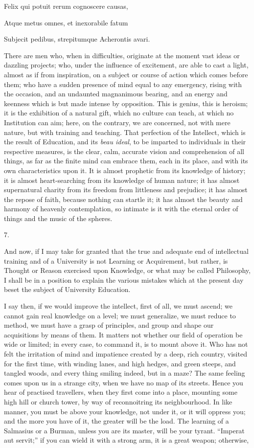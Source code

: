 Felix qui potuit rerum cognoscere causas,

Atque metus omnes, et inexorabile fatum

Subjecit pedibus, strepitumque Acherontis avari.

There are men who, when in difficulties, originate at the moment
vast ideas or dazzling projects; who, under the influence of
excitement, are able to cast a light, almost as if from inspiration,
on a subject or course of action which comes before them; who have a
sudden presence of mind equal to any emergency, rising with the
occasion, and an undaunted magnanimous bearing, and an energy and
keenness which is but made intense by opposition. This is genius, this
is heroism; it is the exhibition of a natural gift, which no culture
can teach, at which no Institution can aim; here, on the
contrary, we are concerned, not with mere nature, but with training
and teaching. That perfection of the Intellect, which is the result of
Education, and its \emph{beau ideal}, to be imparted to individuals in
their respective measures, is the clear, calm, accurate vision and
comprehension of all things, as far as the finite mind can embrace
them, each in its place, and with its own characteristics upon it. It
is almost prophetic from its knowledge of history; it is almost
heart-searching from its knowledge of human nature; it has almost
supernatural charity from its freedom from littleness and prejudice;
it has almost the repose of faith, because nothing can startle it; it
has almost the beauty and harmony of heavenly contemplation, so
intimate is it with the eternal order of things and the music of the
spheres.

7.

And now, if I may take for granted that the true and adequate end
of intellectual training and of a University is not Learning or
Acquirement, but rather, is Thought or Reason exercised upon
Knowledge, or what may be called Philosophy, I shall be in a position
to explain the various mistakes which at the present day beset the
subject of University Education.

I say then, if we would improve the intellect, first of all, we
must ascend; we cannot gain real knowledge on a level; we must
generalize, we must reduce to method, we must have a grasp of
principles, and group and shape our acquisitions by means of them. It
matters not whether our field of operation be wide or limited; in
every case, to command it, is to mount above it. Who has not felt the
irritation of mind and impatience created by a deep, rich country,
visited for the first time, with winding lanes, and high hedges,
and green steeps, and tangled woods, and every thing smiling indeed,
but in a maze? The same feeling comes upon us in a strange city, when
we have no map of its streets. Hence you hear of practised travellers,
when they first come into a place, mounting some high hill or church
tower, by way of reconnoitring its neighbourhood. In like manner, you
must be above your knowledge, not under it, or it will oppress you;
and the more you have of it, the greater will be the load. The
learning of a Salmasius or a Burman, unless you are its master, will
be your tyrant. ``Imperat aut servit;'' if you can wield it
with a strong arm, it is a great weapon; otherwise,


